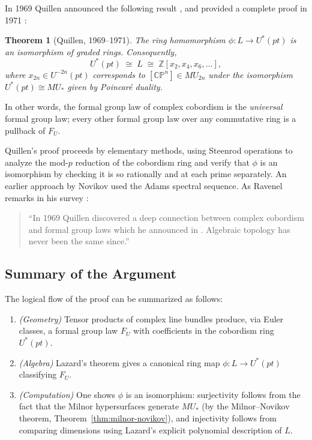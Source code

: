 \documentclass[12pt]{article}
\newtheorem{theorem}{Theorem}[section]
\theoremstyle{definition}
\theoremstyle{remark}
\newcommand{\Z}{\mathbb{Z}}
\newcommand{\CP}{\mathbb{CP}}
\newcommand{\MU}{MU_*}
\newcommand{\Ustar}{U^*(pt)}
\begin{document}
In 1969 Quillen announced the following result \cite{Qui69}, and provided a complete proof in 1971 \cite{Qui71}:

\begin{theorem}[Quillen, 1969--1971]\label{thm:quillen}
The ring homomorphism $\phi : L \longrightarrow \Ustar$ is an isomorphism of graded rings. Consequently,
\[
  \Ustar \;\cong\; L \;\cong\; \Z[x_2, x_4, x_6, \ldots],
\]
where $x_{2n} \in U^{-2n}(pt)$ corresponds to $[\CP^n] \in MU_{2n}$ under the isomorphism $\Ustar \cong \MU$ given by Poincar\'e duality.
\end{theorem}

In other words, the formal group law of complex cobordism is the \emph{universal} formal group law; every other formal group law over any commutative ring is a pullback of $F_U$.

Quillen's proof \cite{Qui71} proceeds by elementary methods, using Steenrod operations to analyze the mod-$p$ reduction of the cobordism ring and verify that $\phi$ is an isomorphism by checking it is so rationally and at each prime separately. An earlier approach by Novikov \cite{Nov67} used the Adams spectral sequence. As Ravenel remarks in his survey \cite{Rav13}:

\begin{quote}
``In 1969 Quillen discovered a deep connection between complex cobordism and formal group laws which he announced in \cite{Qui69}. Algebraic topology has never been the same since.''
\end{quote}

\subsection{Summary of the Argument}

The logical flow of the proof can be summarized as follows:
\begin{enumerate}
  \item \textit{(Geometry)} Tensor products of complex line bundles produce, via Euler classes, a formal group law $F_U$ with coefficients in the cobordism ring $\Ustar$.
  \item \textit{(Algebra)} Lazard's theorem gives a canonical ring map $\phi : L \to \Ustar$ classifying $F_U$.
  \item \textit{(Computation)} One shows $\phi$ is an isomorphism: surjectivity follows from the fact that the Milnor hypersurfaces generate $\MU$ (by the Milnor--Novikov theorem, Theorem~\ref{thm:milnor-novikov}), and injectivity follows from comparing dimensions using Lazard's explicit polynomial description of $L$.
\end{enumerate}
\end{document}

